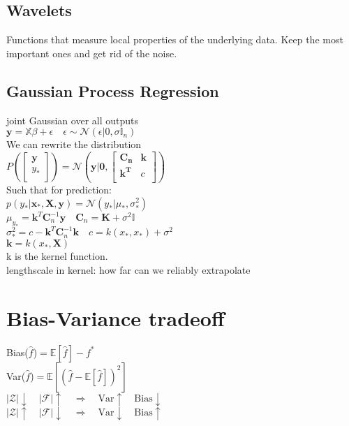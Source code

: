 \subsection*{Wavelets}
Functions that measure local properties of the underlying data. Keep the most important ones and get rid of the noise.

\subsection*{Gaussian Process Regression}
joint Gaussian over all outputs\\
$\mathbf{y}=\mathbb{X}\beta+\epsilon \quad \epsilon\sim \mathcal{N}(\epsilon|0,\sigma\mathbb{I}_n)$\\
We can rewrite the distribution\\
$P(\begin{bmatrix}
\mathbf{y}\\
y_*\\
\end{bmatrix}){=}\mathcal{N}(\mathbf{y}|\mathbf{0},\begin{bmatrix}
\mathbf{C_n} & \mathbf{k} \\
\mathbf{k^T} & c \\
\end{bmatrix})$\\
Such that for prediction:\\
$p(y_*|\mathbf{x_*}, \mathbf{X}, \mathbf{y}){=} \mathcal{N}(y_*|\mu_{*}, \sigma^2_{*})$\\
$\mu_{y_*} = \mathbf{k}^T\mathbf{C}_n^{-1}\mathbf{y}\quad \mathbf{C}_n=\mathbf{K}+\sigma^2\mathbb{I}$\\
$\sigma^2_{*}{=}c{-}\mathbf{k}^T\mathbf{C}_n^{-1}\mathbf{k}\quad c{=}k(x_*,x_*){+}\sigma^2$\\
$\mathbf{k}=k(x_*,\mathbf{X})$\\
k is the kernel function.\\
lengthscale in kernel: how far can we reliably extrapolate


\section*{Bias-Variance tradeoff}
Bias($\hat{f}$)$=\mathbb{E}[\hat{f}]-f^*$\\
Var($\hat{f}$)$=\mathbb{E}[(\hat{f}-\mathbb{E}[\hat{f}])^2]$\\
$|\mathcal{Z}|\downarrow \quad|\mathcal{F}|\uparrow\quad\Rightarrow\quad\mathrm{Var}\uparrow\quad\mathrm{Bias}\downarrow $\\
$|\mathcal{Z}|\uparrow \quad|\mathcal{F}|\downarrow\quad\Rightarrow\quad\mathrm{Var}\downarrow\quad\mathrm{Bias}\uparrow $

